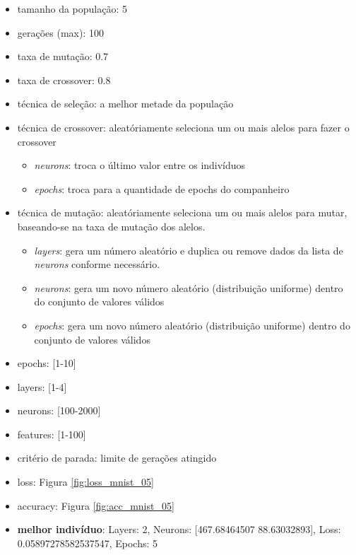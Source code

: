 \documentclass[twoside,conference,a4paper]{IEEEtran}
\begin{document}
\begin{itemize}
    \item tamanho da população: 5
    \item gerações (max): 100
    \item taxa de mutação: 0.7
    \item taxa de crossover: 0.8
    \item técnica de seleção: a melhor metade da população
    \item técnica de crossover: aleatóriamente seleciona um ou mais alelos para fazer o crossover
    \begin{itemize}
        \item \emph{neurons}: troca o último valor entre os indivíduos
        \item \emph{epochs}: troca para a quantidade de epochs do companheiro
    \end{itemize}
    \item técnica de mutação: aleatóriamente seleciona um ou mais alelos para mutar, baseando-se na taxa de mutação dos alelos.
    \begin{itemize}
        \item \emph{layers}: gera um número aleatório e duplica ou remove dados da lista de \emph{neurons} conforme necessário.
        \item \emph{neurons}: gera um novo número aleatório (distribuição uniforme) dentro do conjunto de valores válidos
        \item \emph{epochs}: gera um novo número aleatório (distribuição uniforme) dentro do conjunto de valores válidos
    \end{itemize}
    \item epochs: [1-10]
    \item layers: [1-4]
    \item neurons: [100-2000]
    \item features: [1-100]
    \item critério de parada: limite de gerações atingido
    \item loss: Figura \ref{fig:loss_mnist_05}
    \item accuracy: Figura \ref{fig:acc_mnist_05}
    \item \textbf{melhor indivíduo}: Layers: 2, Neurons: [467.68464507  88.63032893], Loss: 0.05897278582537547, Epochs: 5
\end{itemize}
\end{document}
